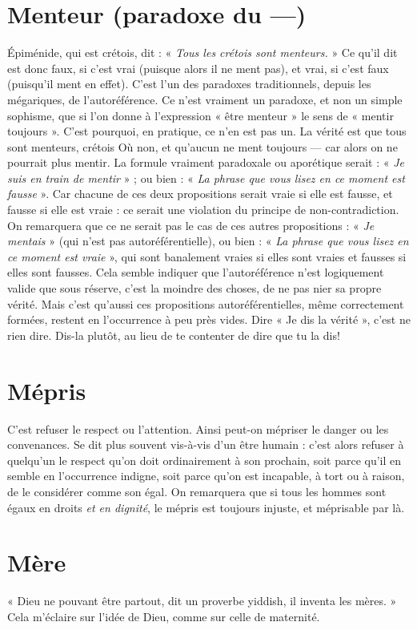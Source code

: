 \section{Menteur (paradoxe du —)}
Épiménide, qui est crétois, dit : « {\it Tous les
crétois sont menteurs.} » Ce qu'il dit est
donc faux, si c’est vrai (puisque alors il ne ment pas), et vrai, si c’est faux
(puisqu'il ment en effet). C’est l’un des paradoxes traditionnels, depuis les
mégariques, de l’autoréférence. Ce n’est vraiment un paradoxe, et non un
simple sophisme, que si l’on donne à l’expression « être menteur » le sens de
« mentir toujours ». C’est pourquoi, en pratique, ce n’en est pas un. La vérité
est que tous sont menteurs, crétois Où non, et qu'aucun ne ment toujours — car
alors on ne pourrait plus mentir. La formule vraiment paradoxale ou aporétique
serait : « {\it Je suis en train de mentir} » ; ou bien : « {\it La phrase que vous lisez en
ce moment est fausse} ». Car chacune de ces deux propositions serait vraie si elle
est fausse, et fausse si elle est vraie : ce serait une violation du principe de
non-contradiction. On remarquera que ce ne serait pas le cas de ces autres
propositions : « {\it Je mentais} » (qui n’est pas autoréférentielle), ou bien : « {\it La
phrase que vous lisez en ce moment est vraie} », qui sont banalement vraies si elles
sont vraies et fausses si elles sont fausses. Cela semble indiquer que l’autoréférence
n’est logiquement valide que sous réserve, c’est la moindre des choses, de
ne pas nier sa propre vérité. Mais c’est qu’aussi ces propositions autoréférentielles,
même correctement formées, restent en l’occurrence à peu près vides.
Dire « Je dis la vérité », c’est ne rien dire. Dis-la plutôt, au lieu de te contenter
de dire que tu la dis!

\section{Mépris}
C'est refuser le respect ou l’attention. Ainsi peut-on mépriser le
danger ou les convenances. Se dit plus souvent vis-à-vis d’un être
humain : c’est alors refuser à quelqu'un le respect qu’on doit ordinairement à
son prochain, soit parce qu’il en semble en l’occurrence indigne, soit parce
qu’on est incapable, à tort ou à raison, de le considérer comme son égal. On
remarquera que si tous les hommes sont égaux en droits {\it et en dignité}, le mépris
est toujours injuste, et méprisable par là.

\section{Mère}
« Dieu ne pouvant être partout, dit un proverbe yiddish, il inventa
les mères. » Cela m’éclaire sur l’idée de Dieu, comme sur celle de
maternité.


